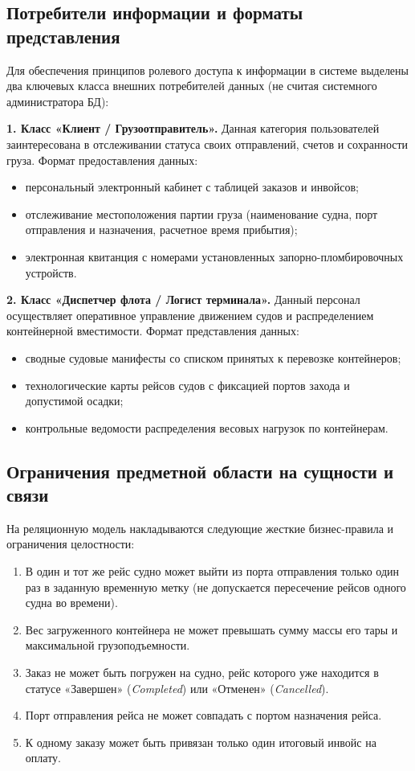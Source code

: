 \documentclass[a4paper,14pt]{article}
\begin{document}
\subsection{Потребители информации и форматы представления}
Для обеспечения принципов ролевого доступа к информации в системе выделены два ключевых класса внешних потребителей данных (не считая системного администратора БД):

\textbf{1. Класс «Клиент / Грузоотправитель».} Данная категория пользователей заинтересована в отслеживании статуса своих отправлений, счетов и сохранности груза. Формат предоставления данных:
\begin{itemize}
    \item персональный электронный кабинет с таблицей заказов и инвойсов;
    \item отслеживание местоположения партии груза (наименование судна, порт отправления и назначения, расчетное время прибытия);
    \item электронная квитанция с номерами установленных запорно-пломбировочных устройств.
\end{itemize}

\textbf{2. Класс «Диспетчер флота / Логист терминала».} Данный персонал осуществляет оперативное управление движением судов и распределением контейнерной вместимости. Формат представления данных:
\begin{itemize}
    \item сводные судовые манифесты со списком принятых к перевозке контейнеров;
    \item технологические карты рейсов судов с фиксацией портов захода и допустимой осадки;
    \item контрольные ведомости распределения весовых нагрузок по контейнерам.
\end{itemize}

\subsection{Ограничения предметной области на сущности и связи}
На реляционную модель накладываются следующие жесткие бизнес-правила и ограничения целостности:
\begin{enumerate}
    \item В один и тот же рейс судно может выйти из порта отправления только один раз в заданную временную метку (не допускается пересечение рейсов одного судна во времени).
    \item Вес загруженного контейнера не может превышать сумму массы его тары и максимальной грузоподъемности.
    \item Заказ не может быть погружен на судно, рейс которого уже находится в статусе «Завершен» (\textit{Completed}) или «Отменен» (\textit{Cancelled}).
    \item Порт отправления рейса не может совпадать с портом назначения рейса.
    \item К одному заказу может быть привязан только один итоговый инвойс на оплату.
\end{enumerate}
\end{document}
